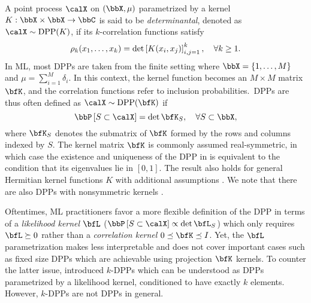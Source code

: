 \documentclass[twoside,11pt]{article}
\begin{document}

        A point process $\calX$ on $(\bbX,\mu)$ parametrized by a kernel $K:\bbX\times \bbX\rightarrow \bbC$ is said to be \emph{determinantal}, denoted as $\calX\sim\DPP(K)$, if its $k$-correlation functions satisfy
        \begin{equation*}
            \label{eq:k-correlation_function_DPP}
            \rho_k(x_1,\dots,x_k)
              = \det \left[ K(x_i, x_j) \right]_{i,j=1}^k,
            \quad \forall k\geq 1.
        \end{equation*}
        In ML, most DPPs are taken from the finite setting where $\bbX = \lrcb{1,\dots,M}$ and $\mu=\sum_{i=1}^M \delta_i$.
        In this context, the kernel function becomes an $M\times M$ matrix $\bfK$, and the correlation functions refer to inclusion probabilities.~DPPs are thus often defined as $\calX\sim \DPP(\bfK)$ if
        \begin{equation}
        \label{eq:inclusion_proba_finite}
            \Proba{S \subset \calX} = \det \bfK_S,
                \quad\forall S\subset \bbX,
        \end{equation}
        where ${\bfK}_S$ denotes the submatrix of $\bfK$ formed by the rows and columns indexed by $S$.
        The kernel matrix $\bfK$ is commonly assumed real-symmetric, in which case the existence and uniqueness of the DPP in  is equivalent to the condition that its eigenvalues lie in $[0,1]$.
        The result also holds for general Hermitian kernel functions $K$ with additional assumptions \cite[Theorem 3]{Sos00}.
        We note that there are also DPPs with nonsymmetric kernels \citep{BoDiFu10}.

        Oftentimes, ML practitioners favor a more flexible definition of the DPP in terms of a \emph{likelihood kernel} $\bfL$
        ($\Proba{S \subset \calX}\propto \det \bfL_S$) which only requires $\bfL\succeq 0$
        rather than a \emph{correlation kernel} $0\preceq \bfK \preceq I$.
        Yet, the $\bfL$ parametrization makes  less interpretable and does not cover important cases such as fixed size DPPs which are achievable using projection $\bfK$ kernels.
        To counter the latter issue, \citet[Section 5]{KuTa12} introduced $k$-DPPs which can be understood as DPPs parametrized by a likelihood kernel, conditioned to have exactly $k$ elements.
        However, $k$-DPPs are not DPPs in general.
\end{document}
